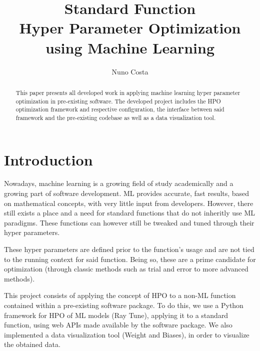 \documentclass[runningheads]{llncs}
\begin{document}
\title{Standard Function\\Hyper Parameter Optimization\\using Machine Learning}

\author{Nuno Costa}


\maketitle

\begin{abstract}

This paper presents all developed work in applying machine learning hyper parameter optimization in pre-existing software. The developed project includes the HPO optimization framework and respective configuration, the interface between said framework and the pre-existing codebase as well as a data visualization tool. 


\end{abstract}

\section{Introduction}

Nowadays, machine learning is a growing field of study academically and a growing part of software development. ML provides accurate, fast results, based on mathematical concepts, with very little input from developers. However, there still exists a place and a need for standard functions that do not inheritly use ML paradigms. These functions can however still be tweaked and tuned through their hyper parameters.

These hyper parameters are defined prior to the function's usage and are not tied to the running context for said function. Being so, these are a prime candidate for optimization (through classic methods such as trial and error to more advanced methods).

This project consists of applying the concept of HPO to a non-ML function contained within a pre-existing software package. To do this, we use a Python framework for HPO of ML models (Ray Tune), applying it to a standard function, using web APIs made available by the software package. We also implemented a data visualization tool (Weight and Biases), in order to visualize the obtained data.
\end{document}
